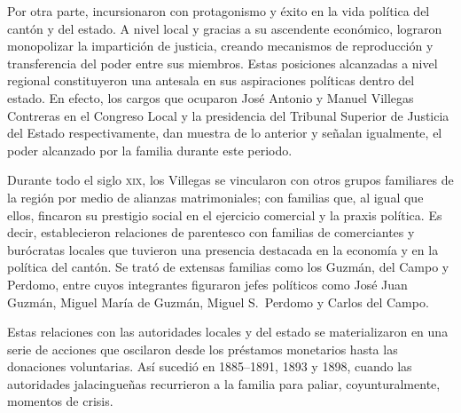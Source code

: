 \documentclass[14pt,twoside,final]{extbook} %
\begin{document}
Por otra parte, incursionaron con protagonismo y éxito en la vida política del cantón y del estado. A nivel local y gracias a su ascendente económico, lograron monopolizar la impartición de justicia, creando mecanismos de reproducción y transferencia del poder entre sus miembros. Estas posiciones alcanzadas a nivel regional constituyeron una antesala en sus aspiraciones políticas dentro del estado. En efecto, los cargos que ocuparon José Antonio y Manuel Villegas Contreras en el Congreso Local y la presidencia del Tribunal Superior de Justicia del Estado respectivamente, dan muestra de lo anterior y señalan igualmente, el poder alcanzado por la familia durante este periodo.

Durante todo el siglo \textsc{xix}, los Villegas se vincularon con otros grupos familiares de la región por medio de alianzas matrimoniales; con familias que, al igual que ellos, fincaron su prestigio social en el ejercicio comercial y la praxis política. Es decir, establecieron relaciones de parentesco con familias de comerciantes y burócratas locales que tuvieron una presencia destacada en la economía y en la política del cantón. Se trató de extensas familias como los Guzmán, del Campo y Perdomo, entre cuyos integrantes figuraron jefes políticos como José Juan Guzmán, Miguel María de Guzmán, Miguel S.~Perdomo y Carlos del Campo.

Estas relaciones con las autoridades locales y del estado se materializaron en una serie de acciones que oscilaron desde los préstamos monetarios hasta las donaciones voluntarias. Así sucedió en 1885--1891, 1893 y 1898, cuando las autoridades jalacingueñas recurrieron a la familia para paliar, coyunturalmente, momentos de crisis.
\end{document}
